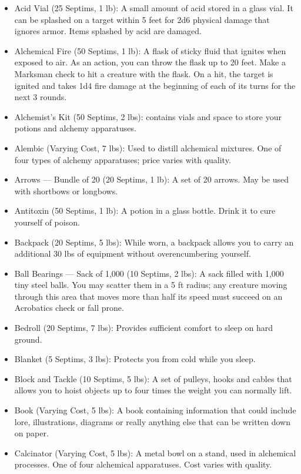 \documentclass[12pt]{book}
\begin{document}
\begin{itemize}
	\item Acid Vial (25 Septims, 1 lb): A small amount of acid stored in a glass vial. It can be splashed on a target within 5 feet for 2d6 physical damage that ignores armor. Items splashed by acid are damaged.
	\item Alchemical Fire (50 Septims, 1 lb): A flask of sticky fluid that ignites when exposed to air. As an action, you can throw the flask up to 20 feet. Make a Marksman check to hit a creature with the flask. On a hit, the target is ignited and takes 1d4 fire damage at the beginning of each of its turns for the next 3 rounds.
	\item Alchemist's Kit (50 Septims, 2 lbs): contains vials and space to store your potions and alchemy apparatuses.
	\item Alembic (Varying Cost, 7 lbs): Used to distill alchemical mixtures. One of four types of alchemy apparatuses; price varies with quality.
	\item Arrows --- Bundle of 20 (20 Septims, 1 lb): A set of 20 arrows. May be used with shortbows or longbows.
	\item Antitoxin (50 Septims, 1 lb): A potion in a glass bottle. Drink it to cure yourself of poison.
	\item Backpack (20 Septims, 5 lbs): While worn, a backpack allows you to carry an additional 30 lbs of equipment without overencumbering yourself.
	\item Ball Bearings --- Sack of 1,000 (10 Septims, 2 lbs): A sack filled with 1,000 tiny steel balls. You may scatter them in a 5 ft radius; any creature moving through this area that moves more than half its speed must succeed on an Acrobatics check or fall prone.
	\item Bedroll (20 Septims, 7 lbs): Provides sufficient comfort to sleep on hard ground.
	\item Blanket (5 Septims, 3 lbs): Protects you from cold while you sleep.
	\item Block and Tackle (10 Septims, 5 lbs): A set of pulleys, hooks and cables that allows you to hoist objects up to four times the weight you can normally lift.
	\item Book (Varying Cost, 5 lbs): A book containing information that could include lore, illustrations, diagrams or really anything else that can be written down on paper.
	\item Calcinator (Varying Cost, 5 lbs): A metal bowl on a stand, used in alchemical processes. One of four alchemical apparatuses. Cost varies with quality.

\end{itemize}
\end{document}
